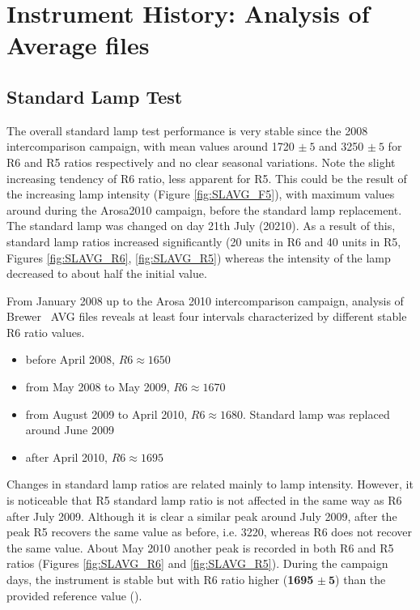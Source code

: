 
\section{Instrument History: Analysis of Average files} \label{sec:AVG}

\subsection{Standard Lamp Test} \label{subsec:SL}
The overall standard lamp test performance is very stable since the 2008 intercomparison campaign, with mean values around 1720 $\pm\ 5$ and 3250 $\pm\ 5$ for R6 and R5 ratios respectively and no clear seasonal variations. Note the slight increasing tendency of R6 ratio, less apparent for R5. This could be the result of the  increasing lamp intensity (Figure \ref{fig:SLAVG_F5}), with maximum values around  during the Arosa2010 campaign, before the standard lamp replacement.\newline
The standard lamp was changed on day 21th July (20210). As a result of this, standard lamp ratios increased significantly (20 units in R6 and 40 units in R5, Figures \ref{fig:SLAVG_R6}, \ref{fig:SLAVG_R5}) whereas the intensity of the lamp decreased to about half the initial value.

From January 2008 up to the Arosa 2010 intercomparison campaign, analysis of Brewer \textbf{\brwname}\ \textsc{AVG} files reveals at least four intervals characterized by different stable R6 ratio values.


\begin{itemize}
	\item before April 2008, $R6\approx1650$
	\item from May 2008 to May 2009, $R6\approx1670$
	\item from August 2009 to April 2010, $R6\approx1680$. Standard lamp was replaced around June 2009
	\item after April 2010, $R6\approx1695$
\end{itemize}

Changes in standard lamp ratios are related mainly to lamp intensity. However, it is noticeable that R5 standard lamp ratio is not affected in the same way as R6 after July 2009. Although it is clear a similar peak around July 2009, after the peak R5 recovers the same value as before, i.e. 3220, whereas R6 does not recover the same value. About May 2010 another peak is recorded in both R6 and R5 ratios (Figures \ref{fig:SLAVG_R6} and \ref{fig:SLAVG_R5}). During the campaign days, the instrument is stable but with R6 ratio higher (\textbf{1695} $\pm\ \mathbf{5}$) than the provided reference value (\textbf{\slref}).

